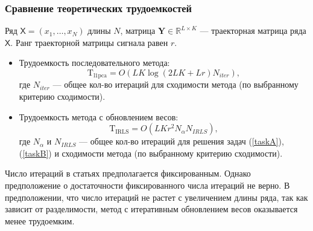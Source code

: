 \documentclass[10pt, ucs, notheorems, handout]{beamer}
\newcommand{\tX}[1]{\mathsf{#1}}
\begin{document}
\begin{frame}
\frametitle{Сравнение теоретических трудоемкостей}
Ряд $\tX{X}=(x_1, \ldots, x_{N})$ длины $N$, матрица $\mathbf{Y}\in \mathbb{R}^{L\times K}$ --- траекторная матрица ряда $\tX{X}$. Ранг траекторной матрицы сигнала равен $r$.
\begin{itemize}
\item Трудоемкость последовательного метода: 
\begin{equation*}
\mathrm{T}_{\mathrm{l1pca}} = O(LK\log (2LK+Lr)N_{iter}),
\end{equation*}
где $N_{iter}$ — общее кол-во итераций для сходимости метода (по выбранному критерию сходимости).

\item Трудоемкость метода с обновлением весов: 
\begin{equation*}
\mathrm{T}_{\mathrm{IRLS}} = O(LKr^2N_\alpha N_{IRLS}),
\end{equation*}
где $N_\alpha$ и $N_{IRLS}$ — общее кол-во итераций для решения задач (\ref{taskA}), (\ref{taskB}) и сходимости метода (по выбранному критерию сходимости).
\end{itemize}

Число итераций в статьях предполагается фиксированным. Однако предположение о достаточности фиксированного числа итераций не верно. В предположении, что число итераций не растет с увеличением длины ряда, так как зависит от разделимости, метод с итеративным обновлением весов оказывается менее трудоемким.
\end{frame}
\end{document}
